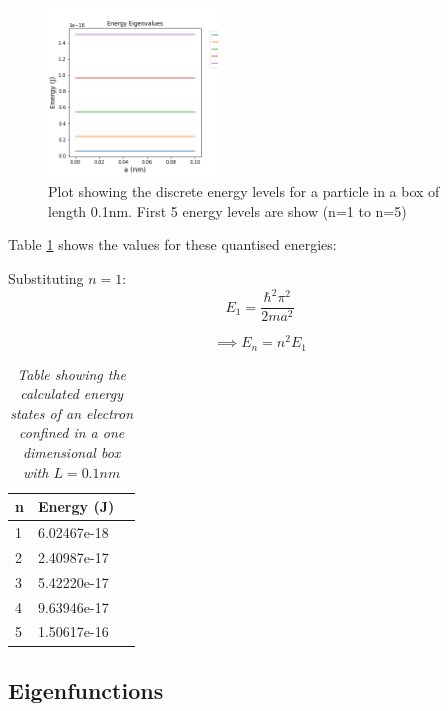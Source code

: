 \begin{figure}[h]
    \centering
    \includegraphics[width=0.4\textwidth]{lab1/images/eigenvaluesEnergy.png}
    \caption{Plot showing the discrete energy levels for a particle in a box of length 0.1nm. First 5 energy levels are show (n=1 to n=5)}
    \label{fig:eigenEnergy}
\end{figure}

Table \ref{tab:qEnerergy} shows the values for these quantised energies:

Substituting $n=1$:
$$E_1 = \frac{\hbar ^{2}\pi^{2}}{2ma^{2}}$$

\begin{equation}\label{eq:energySpacing}
\implies E_n =  n^{2}E_1
\end{equation}




\begin{table}[h!]
\centering
\begin{tabular}{|l|l|l|}
\hline
\textbf{n} & \textbf{Energy (J)} \\ \hline
1 & 6.02467e-18 \\ \hline
2 & 2.40987e-17 \\ \hline
3 & 5.42220e-17 \\ \hline
4 & 9.63946e-17 \\ \hline
5 & 1.50617e-16 \\ \hline
\end{tabular}
\caption{\textit{Table showing the calculated energy states of an electron confined in a one dimensional box with $L=0.1nm$}}
\label{tab:qEnerergy}
\end{table}

\subsection{Eigenfunctions}\label{sec:eigenFunction}

